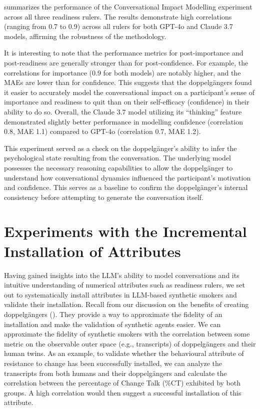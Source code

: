  summarizes the performance of the Conversational Impact Modelling experiment across all three readiness rulers. The results demonstrate high correlations (ranging from 0.7 to 0.9) across all rulers for both GPT-4o and Claude 3.7 models, affirming the robustness of the methodology.

It is interesting to note that the performance metrics for post-importance and
post-readiness are generally stronger than for post-confidence. For example, the
correlations for importance (0.9 for both models) are notably higher, and the MAEs are
lower than for confidence. This suggests that the doppelgängers found it easier to
accurately model the conversational impact on a participant's sense of importance and
readiness to quit than on their self-efficacy (confidence) in their ability to do so.
Overall, the Claude 3.7 model utilizing its ``thinking'' feature demonstrated slightly
better performance in modelling confidence (correlation 0.8, MAE 1.1) compared to
GPT-4o (correlation 0.7, MAE 1.2).

This experiment served as a check on the doppelgänger's ability to infer the
psychological state resulting from the conversation. The underlying model possesses the
necessary reasoning capabilities to allow the doppelgänger to understand how
conversational dynamics influenced the participant's motivation and confidence. This
serves as a baseline to confirm the doppelgänger's internal consistency before
attempting to generate the conversation itself.

\section{Experiments with the Incremental Installation of Attributes}
Having gained insights into the LLM's ability to model conversations and its intuitive
understanding of numerical attributes such as readiness rulers, we set out to
systematically install attributes in LLM-based synthetic smokers and validate their
installation. Recall from our discussion on the benefits of creating doppelgängers
(). They provide a way to approximate the
fidelity of an installation and make the validation of synthetic agents easier. We can
approximate the fidelity of synthetic smokers with the correlation between some metric
on the observable outer space (e.g., transcripts) of doppelgängers and their human
twins. As an example, to validate whether the behavioural attribute of resistance to
change has been successfully installed, we can analyze the transcripts from both humans
and their doppelgängers and calculate the correlation between the percentage of Change
Talk (\%CT) exhibited by both groups. A high correlation would then suggest a
successful installation of this attribute.

